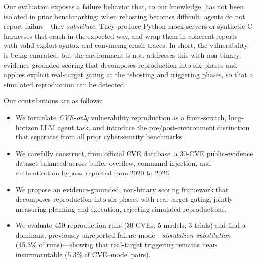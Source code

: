 Our evaluation exposes a failure behavior that, to our knowledge, has not been isolated in prior benchmarking: when rehosting becomes difficult, agents do not report failure---they \emph{substitute}. 
%
They produce Python mock servers or synthetic C harnesses that crash in the expected way, and wrap them in coherent reports with valid exploit syntax and convincing crash traces. 
%
In short, the vulnerability is being emulated, but the environment is not. 
%
\sys{} addresses this with non-binary, evidence-grounded scoring that decomposes reproduction into six phases and applies explicit real-target gating at the rehosting and triggering phases, so that a simulated reproduction can be detected. 
%


Our contributions are as follows:
\begin{itemize}

\item We formulate \emph{CVE-only} vulnerability reproduction as a from-scratch, long-horizon LLM agent task, and introduce the pre/post-environment distinction that separates \sys{} from all prior cybersecurity benchmarks.

\item We carefully construct, from official CVE database, a 30-CVE public-evidence dataset balanced across buffer overflow, command injection, and authentication bypass, reported from 2020 to 2026.

\item We propose an evidence-grounded, non-binary scoring framework that decomposes reproduction into six phases with real-target gating, jointly measuring planning and execution, rejecting simulated reproductions.

\item We evaluate 450 reproduction runs (30 CVEs, 5 models, 3 trials) and find a dominant, previously unreported failure mode---\emph{simulation substitution} (45.3\% of runs)---showing that real-target triggering remains near-insurmountable (5.3\% of CVE--model pairs).

\end{itemize}

